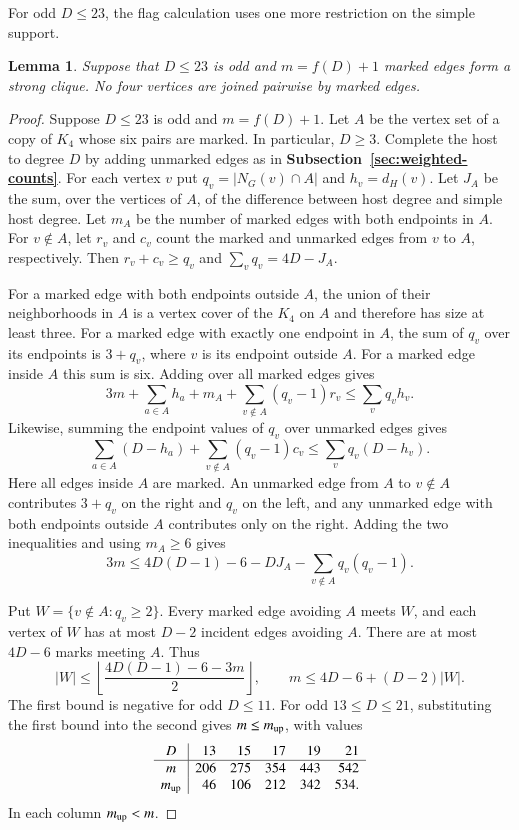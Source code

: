 \documentclass[preprint,11pt,numbers]{elsarticle-arxiv}
\numberwithin{equation}{section}
\newtheorem{lemma}[theorem]{Lemma}
\theoremstyle{definition}
\begin{document}
For odd $D\leq23$, the flag calculation uses one more restriction
on the simple support.

\begin{lemma}\label{lem:finite-k4}
Suppose that $D\leq23$ is odd and $m=f(D)+1$ marked edges form a
strong clique. No four vertices are joined pairwise by marked edges.
\end{lemma}

\begin{proof}

Suppose $D\le23$ is odd and $m=f(D)+1$. Let $A$ be the
vertex set of a copy of $K_4$ whose six pairs are marked. In particular,
$D\ge3$.
Complete the host to degree $D$ by adding unmarked edges
as in \textbf{Subsection~\ref{sec:weighted-counts}}. For each vertex $v$ put
$q_v=|N_G(v)\cap A|$ and $h_v=d_H(v)$. Let $J_A$ be
the sum, over the vertices of $A$, of the difference
between host degree and simple host degree. Let $m_A$
be the number of marked edges with both endpoints in
$A$. For $v\notin A$, let $r_v$ and $c_v$ count the
marked and unmarked edges from $v$ to $A$, respectively.
Then $r_v+c_v\ge q_v$ and $\sum_v q_v=4D-J_A$.

For a marked edge with both endpoints outside $A$, the
union of their neighborhoods in $A$ is a vertex cover of the
$K_4$ on $A$ and therefore has size at least three. For a
marked edge with exactly one endpoint in $A$, the sum
of $q_v$ over its endpoints is $3+q_v$, where $v$ is its
endpoint outside $A$. For a marked edge inside $A$ this
sum is six. Adding over all marked edges gives
\[
 3m+\sum_{a\in A}h_a+m_A+
 \sum_{v\notin A}(q_v-1)r_v\le\sum_v q_vh_v.
\]
Likewise, summing the endpoint values of $q_v$ over
unmarked edges gives
\[
 \sum_{a\in A}(D-h_a)+\sum_{v\notin A}(q_v-1)c_v
 \le\sum_v q_v(D-h_v).
\]
Here all edges inside $A$ are marked. An unmarked edge
from $A$ to $v\notin A$ contributes $3+q_v$ on the right
and $q_v$ on the left, and any unmarked edge with both
endpoints outside $A$ contributes only on the right.
Adding the two inequalities and using $m_A\ge6$ gives
\begin{equation}\label{eq:multi-k4-loss}
 3m\le4D(D-1)-6-DJ_A-\sum_{v\notin A}q_v(q_v-1).
\end{equation}

Put $W=\{v\notin A:q_v\ge2\}$. Every marked edge
avoiding $A$ meets $W$, and each vertex of $W$ has at
most $D-2$ incident edges avoiding $A$. There are at
most $4D-6$ marks meeting $A$. Thus
\[
 |W|\le\left\lfloor\frac{4D(D-1)-6-3m}{2}\right\rfloor,
 \qquad m\le4D-6+(D-2)|W|.
\]
The first bound is negative for odd $D\le11$. For odd
$13\le D\le21$, substituting the first bound into the
second gives $m\le m_{\rm up}$, with values
\[
\begin{array}{c|rrrrr}
 D&13&15&17&19&21\\ \hline
 m&206&275&354&443&542\\
 m_{\rm up}&46&106&212&342&534.
\end{array}
\]
In each column $m_{\rm up}<m$.


\end{proof}
\end{document}
